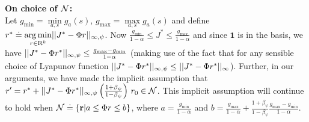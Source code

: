 \begin{appendix}
\textbf{On choice of $\mathcal{N}$:}\\
Let $g_{\min}=\underset{a,s}{\min}g_a(s)$, $g_{\max}=\underset{a,s}{\max}g_a(s)$ and define $r^*\doteq\underset{r\in \mathrm{R}^k}{\arg\min}||J^*-\Phi r||_{\infty,\psi}$. Now $\frac{g_{\min}}{1-\alpha}\leq J^* \leq \frac{g_{\max}}{1-\alpha}$ and since $\mathbf{1}$ is in the basis, we have $||J^*-\Phi r^*||_{\infty,\psi}\leq \frac{g_{\max}-g_{\min}}{1-\alpha}$ (making use of the fact that for any sensible choice of Lyapunov function $||J^*-\Phi r^*||_{\infty,\psi}\leq ||J^*-\Phi r^*||_{\infty}$). Further, in our arguments, we have made the implicit assumption that $r'= r^*+||J^*-\Phi r^*||_{\infty,\psi} \left(\frac{1+\beta_{\psi}}{1-\beta_{\psi}}\right)\, r_0 \in \mathcal{N}$. This implicit assumption will continue to hold when $\mathcal{N}\doteq\{\mathbf{r}| a\leq \Phi r\leq b\}$, where $a=\frac{g_{\min}}{1-\alpha}$ and $b=\frac{g_{\max}}{1-\alpha}+\frac{1+\beta_{\psi}}{1-\beta_{\psi}}\frac{g_{\max}-g_{\min}}{1-\alpha}$.
\end{appendix}
